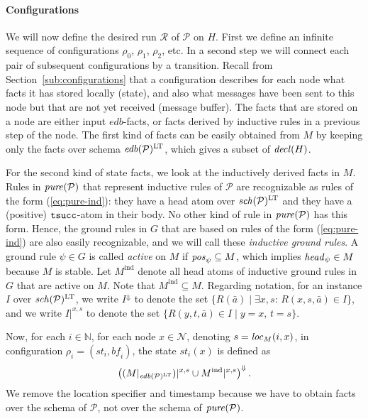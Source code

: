 \documentclass{tlp}
\newcommand{\Nat}{\mathbb{N}}  \newcommand{\len}[1]{|#1|} \newcommand{\rom}[1]{\text{\emph{(#1)}}} \newcommand{\romI}{\rom i}
\newcommand{\ded}{\mathcal{P}}
\newcommand{\proj}[2]{#1|_{#2}}
\newcommand{\head}[1]{\fname{head}_{#1}}
\newcommand{\bpos}[1]{\fname{pos}_{#1}}
\newcommand{\edb}[1]{\fname{edb}(#1)}
\newcommand{\schof}[1]{\fname{sch}(#1)}
\newcommand{\grl}{\psi}
\newcommand{\nw}{\mathcal{N}}
\newcommand{\sh}[1]{(#1)}
\newcommand{\toloct}[1]{#1^{\mathrm{LT}}}
\newcommand{\projlt}[3]{#1|^{#2,#3}}
\newcommand{\shprojlt}[3]{\projlt{\sh{#1}}{#2}{#3}}
\newcommand{\droplt}[1]{#1^{\Downarrow}}
\newcommand{\timesucc}{\pred{tsucc}}
\newcommand{\decl}[1]{\fname{decl}(#1)}
\newcommand{\pure}[1]{\fname{pure}(#1)}
\newcommand{\cnf}{\rho}
\newcommand{\cnfs}{\mathit{st}}
\newcommand{\cnfb}{\mathit{bf}}
\newcommand{\run}{\mathcal{R}}
\newcommand{\grded}{G}
\newcommand{\locM}[1]{\fname{loc}_{M}(#1)}
\newcommand{\Mind}{M^{\mathrm{ind}}}
\begin{document}
\paragraph*{Configurations}

We will now define the desired run $\run$ of $\ded$ on $H$. First
we define an infinite sequence of configurations $\cnf_{0}$, $\cnf_{1}$,
$\cnf_{2}$, etc. In a second step we will connect each pair of subsequent
configurations by a transition. Recall from Section~\ref{sub:configurations}
that a configuration describes for each node what facts it has stored
locally (state), and also what messages have been sent to this node
but that are not yet received (message buffer). The facts that are
stored on a node are either input $\mathit{edb}$-facts, or facts
derived by inductive rules in a previous step of the node. The first
kind of facts can be easily obtained from $M$ by keeping only the
facts over schema $\toloct{\edb{\ded}}$, which gives a subset of
$\decl H$. 

For the second kind of state facts, we look at the inductively derived
facts in $M$. Rules in $\pure{\ded}$ that represent inductive rules
of $\ded$ are recognizable as rules of the form (\ref{eq:pure-ind}):
they have a head atom over $\toloct{\schof{\ded}}$ and they have
a (positive) $\timesucc$-atom in their body. No other kind of rule
in $\pure{\ded}$ has this form. Hence, the ground rules in $\grded$
that are based on rules of the form (\ref{eq:pure-ind}) are also
easily recognizable, and we will call these \emph{inductive ground
rules}. A ground rule $\grl\in\grded$ is called \emph{active}
on $M$ if $\bpos{\grl}\subseteq M$, which implies $\head{\grl}\in M$
because $M$ is stable. Let $\Mind$ denote all head atoms of inductive
ground rules in $\grded$ that are active on $M$. Note that $\Mind\subseteq M$.
Regarding notation, for an instance $I$ over $\toloct{\schof{\ded}}$,
we write $\droplt I$ to denote the set $\{R(\bar{a})\mid\exists x,s:\, R(x,s,\bar{a})\in I\}$,
and we write $\projlt Ixs$ to denote the set $\{R(y,t,\bar{a})\in I\mid y=x,\, t=s\}$. 

Now, for each $i\in\Nat$, for each node $x\in\nw$, denoting $s=\locM{i,x}$,
in configuration $\cnf_{i}=(\cnfs_{i},\cnfb_{i})$, the state $\cnfs_{i}(x)$
is defined as
\[
\droplt{\left(\shprojlt{\proj M{\toloct{\edb{\ded}}}}xs\cup\projlt{\Mind}xs\right)}.
\]
We remove the location specifier and timestamp because we have to
obtain facts over the schema of $\ded$, not over the schema of $\pure{\ded}$.
\end{document}
